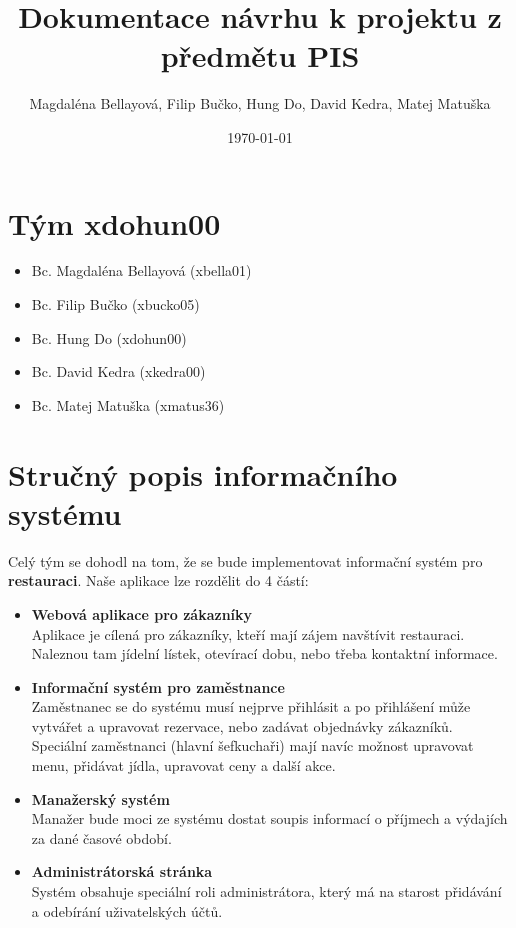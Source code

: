 \documentclass[a4paper]{article}
\title{Dokumentace návrhu k projektu z předmětu PIS}
\author{Magdaléna Bellayová, Filip Bučko, Hung Do, David Kedra, Matej Matuška}
\date{\today}
\begin{document}
\maketitle
\tableofcontents

\newpage

\section{Tým xdohun00}
\begin{itemize}
    \item Bc. Magdaléna Bellayová (xbella01)
    \item Bc. Filip Bučko (xbucko05)
    \item Bc. Hung Do (xdohun00)
    \item Bc. David Kedra (xkedra00)
    \item Bc. Matej Matuška (xmatus36)
\end{itemize}

\section{Stručný popis informačního systému}
Celý tým se dohodl na tom, že se bude implementovat informační systém pro
\textbf{restauraci}. Naše aplikace lze rozdělit do 4 částí:

\begin{itemize}
    \item \textbf{Webová aplikace pro zákazníky} \\
    Aplikace je cílená pro zákazníky, kteří mají zájem navštívit restauraci. Naleznou tam
    jídelní lístek, otevírací dobu, nebo třeba kontaktní informace.

    \item \textbf{Informační systém pro zaměstnance}  \\
    Zaměstnanec se do systému musí nejprve přihlásit a po přihlášení může vytvářet a
    upravovat rezervace, nebo zadávat objednávky zákazníků. Speciální zaměstnanci (hlavní
    šefkuchaři) mají navíc možnost upravovat menu, přidávat jídla, upravovat ceny a další akce.

    \item \textbf{Manažerský systém} \\
    Manažer bude moci ze systému dostat soupis informací o příjmech a výdajích za dané
    časové období.

    \item \textbf{Administrátorská stránka} \\
    Systém obsahuje speciální roli administrátora, který má na starost přidávání a odebírání
    uživatelských účtů.
\end{itemize}
\end{document}
